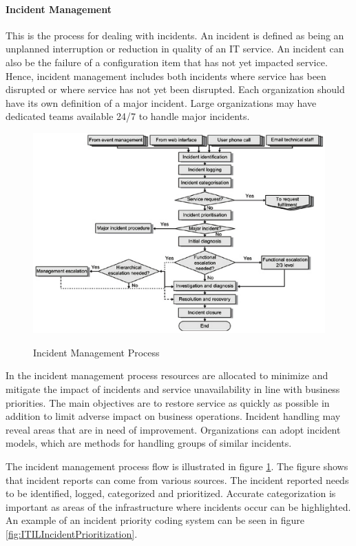 \paragraph{Incident Management}
This is the process for dealing with incidents. An incident is defined as being an unplanned interruption or reduction in quality of an IT service. An incident can also be the failure of a configuration item that has not yet impacted service. Hence, incident management includes both incidents where service has been disrupted or where service has not yet been disrupted. Each organization should have its own definition of a major incident. Large organizations may have dedicated teams available 24/7 to handle major incidents. 

\begin{figure}
\centering
\scalebox{0.45}
{\includegraphics{ITILIncidentManagement.png}}
\caption[The ITIL Incident Management Process]{Incident Management Process \cite{itilbok}} 
\label{fig:ITILIncidentManagement}
\end{figure}

\pagebreak
In the incident management process resources are allocated to minimize and mitigate the impact of incidents and service unavailability in line with business priorities. The main objectives are to restore service as quickly as possible in addition to limit adverse impact on business operations. Incident handling may reveal areas that are in need of improvement. Organizations can adopt incident models, which are methods for handling groups of similar incidents.

The incident management process flow is illustrated in figure \ref{fig:ITILIncidentManagement}. The figure shows that incident reports can come from various sources. The incident reported needs to be identified, logged, categorized and prioritized. Accurate categorization is important as areas of the infrastructure where incidents occur can be highlighted. An example of an incident priority coding system can be seen in figure \ref{fig:ITILIncidentPrioritization}.

